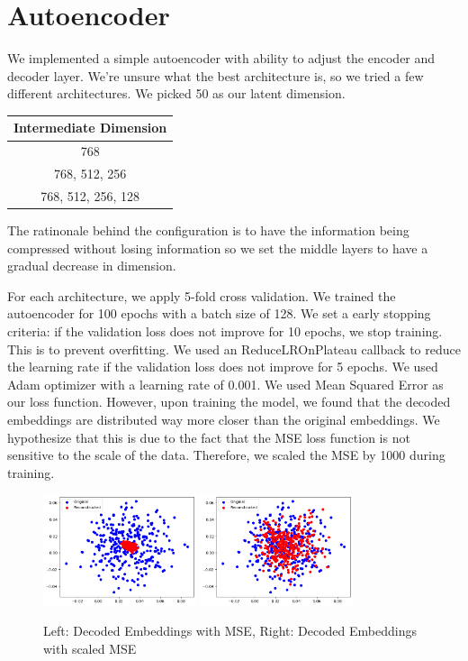 \documentclass{article}
\begin{document}
\section*{Autoencoder}
We implemented a simple autoencoder with ability to adjust the encoder and decoder layer. We're unsure what the best architecture is, so we tried a few different architectures. We picked 50 as our latent dimension. 
\begin{center}
\begin{tabular}{|c|}
    \hline
    Intermediate Dimension \\
    \hline
    768 \\
    \hline
    768, 512, 256 \\
    \hline
    768, 512, 256, 128 \\
    \hline
\end{tabular}
\end{center}

The ratinonale behind the configuration is to have the information being compressed without losing information so we set the middle layers to have a gradual decrease in dimension.

For each architecture, we apply 5-fold cross validation. We trained the autoencoder for 100 epochs with a batch size of 128. We set a early stopping criteria: if the validation loss does not improve for 10 epochs, we stop training. This is to prevent overfitting. We used an ReduceLROnPlateau callback to reduce the learning rate if the validation loss does not improve for 5 epochs. We used Adam optimizer with a learning rate of 0.001. We used Mean Squared Error as our loss function. However, upon training the model, we found that the decoded embeddings are distributed way more closer than the original embeddings. We hypothesize that this is due to the fact that the MSE loss function is not sensitive to the scale of the data. Therefore, we scaled the MSE by 1000 during training. 

\begin{figure}[h!]
\centering
\includegraphics[width=0.4\textwidth]{figs/scatter2.png}
\includegraphics[width=0.4\textwidth]{figs/scatter1.png}
\caption{Left: Decoded Embeddings with MSE, Right: Decoded Embeddings with scaled MSE}
\end{figure}
\end{document}

